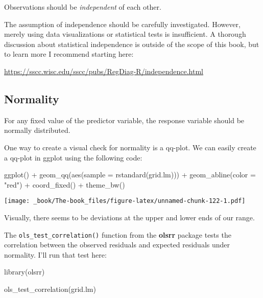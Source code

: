 \documentclass[
]{book}
\newenvironment{Shaded}{\begin{snugshade}}{\end{snugshade}}
\newcommand{\AttributeTok}[1]{\textcolor[rgb]{0.77,0.63,0.00}{#1}}
\newcommand{\FunctionTok}[1]{\textcolor[rgb]{0.00,0.00,0.00}{#1}}
\newcommand{\NormalTok}[1]{#1}
\newcommand{\SpecialCharTok}[1]{\textcolor[rgb]{0.00,0.00,0.00}{#1}}
\newcommand{\StringTok}[1]{\textcolor[rgb]{0.31,0.60,0.02}{#1}}
\begin{document}
Observations should be \emph{independent} of each other.

The assumption of independence should be carefully investigated. However, merely using data visualizations or statistical tests is insufficient. A thorough discussion about statistical independence is outside of the scope of this book, but to learn more I recommend starting here:

\url{https://sscc.wisc.edu/sscc/pubs/RegDiag-R/independence.html}

\hypertarget{normality}{%
\subsection{Normality}\label{normality}}

For any fixed value of the predictor variable, the response variable should be normally distributed.

One way to create a visual check for normality is a qq-plot. We can easily create a qq-plot in ggplot using the following code:

\begin{Shaded}
\begin{Highlighting}[]
\FunctionTok{ggplot}\NormalTok{() }\SpecialCharTok{+}
  \FunctionTok{geom\_qq}\NormalTok{(}\FunctionTok{aes}\NormalTok{(}\AttributeTok{sample =} \FunctionTok{rstandard}\NormalTok{(grid.lm))) }\SpecialCharTok{+}
  \FunctionTok{geom\_abline}\NormalTok{(}\AttributeTok{color =} \StringTok{"red"}\NormalTok{) }\SpecialCharTok{+}
  \FunctionTok{coord\_fixed}\NormalTok{() }\SpecialCharTok{+}
  \FunctionTok{theme\_bw}\NormalTok{()}
\end{Highlighting}
\end{Shaded}

\texttt{[image: \_book/The-book\_files/figure-latex/unnamed-chunk-122-1.pdf]}

Visually, there seems to be deviations at the upper and lower ends of our range.

The \texttt{ols\_test\_correlation()} function from the \textbf{olsrr} package tests the correlation between the observed residuals and expected residuals under normality. I'll run that test here:

\begin{Shaded}
\begin{Highlighting}[]
\FunctionTok{library}\NormalTok{(olsrr)}

\FunctionTok{ols\_test\_correlation}\NormalTok{(grid.lm)}
\end{Highlighting}
\end{Shaded}
\end{document}
